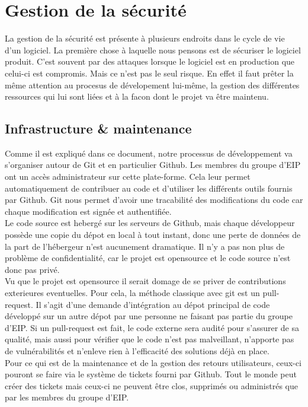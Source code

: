 \section{Gestion de la sécurité}

La gestion de la sécurité est présente à plusieurs endroits dans le cycle de vie d'un logiciel. La première chose à laquelle nous pensons est de sécuriser le logiciel produit. C'est souvent par des attaques lorsque le logiciel est en production que celui-ci est compromis. Mais ce n'est pas le seul risque. En effet il faut prêter la même attention au procesus de dévelopement lui-même, la gestion des différentes ressources qui lui sont liées et à la facon dont le projet va être maintenu.

\subsection{Infrastructure \& maintenance}

Comme il est expliqué dans ce document, notre processus de développement va s'organiser autour de Git et en particulier Github. Les membres du groupe d'EIP ont un accès administrateur sur cette plate-forme. Cela leur permet automatiquement de contribuer au code et d'utiliser les différents outils fournis par Github. Git nous permet d'avoir une tracabilité des modifications du code car chaque modification est signée et authentifiée.\\

Le code source est hebergé sur les serveurs de Github, mais chaque développeur possède une copie du dépot en local à tout instant, donc une perte de données de la part de l'hébergeur n'est aucunement dramatique. Il n'y a pas non plus de problème de confidentialité, car le projet est opensource et le code source n'est donc pas privé.\\

Vu que le projet est opensource il serait domage de se priver de contributions exterieures eventuelles. Pour cela, la méthode classique avec git est un pull-request. Il s'agit d'une demande d'intégration au dépot principal de code développé sur un autre dépot par une personne ne faisant pas partie du groupe d'EIP. Si un pull-request est fait, le code externe sera audité pour s'assurer de sa qualité, mais aussi pour vérifier que le code n'est pas malveillant, n'apporte pas de vulnérabilités et n'enleve rien à l'efficacité des solutions déjà en place.\\

Pour ce qui est de la maintenance et de la gestion des retours utilisateurs, ceux-ci pouront se faire via le système de tickets fourni par Github. Tout le monde peut créer des tickets mais ceux-ci ne peuvent être clos, supprimés ou administrés que par les membres du groupe d'EIP.

